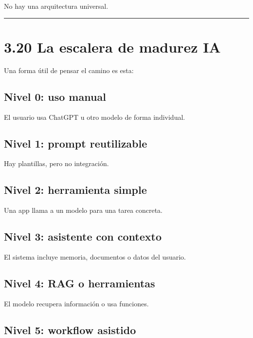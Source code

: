 No hay una arquitectura universal.

\begin{center}\rule{0.5\linewidth}{0.5pt}\end{center}

\section{3.20 La escalera de madurez
IA}\label{la-escalera-de-madurez-ia}

Una forma útil de pensar el camino es esta:

\subsection{Nivel 0: uso manual}\label{nivel-0-uso-manual}

El usuario usa ChatGPT u otro modelo de forma individual.

\subsection{Nivel 1: prompt
reutilizable}\label{nivel-1-prompt-reutilizable}

Hay plantillas, pero no integración.

\subsection{Nivel 2: herramienta
simple}\label{nivel-2-herramienta-simple}

Una app llama a un modelo para una tarea concreta.

\subsection{Nivel 3: asistente con
contexto}\label{nivel-3-asistente-con-contexto}

El sistema incluye memoria, documentos o datos del usuario.

\subsection{Nivel 4: RAG o
herramientas}\label{nivel-4-rag-o-herramientas}

El modelo recupera información o usa funciones.

\subsection{Nivel 5: workflow asistido}\label{nivel-5-workflow-asistido}

